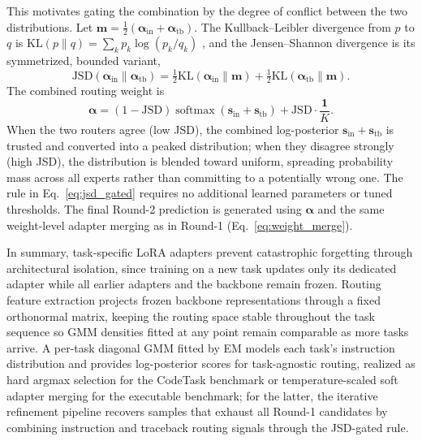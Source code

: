 This motivates gating the combination by the degree of conflict between the two distributions. Let $\mathbf{m}=\tfrac{1}{2}(\bm{\alpha}_{\mathrm{in}}+\bm{\alpha}_{\mathrm{tb}})$. The Kullback--Leibler divergence from $p$ to $q$ is $\mathrm{KL}(p\|q)=\sum_k p_k\log(p_k/q_k)$ \citep{kullback1951information}, and the Jensen--Shannon divergence \citep{lin1991divergence} is its symmetrized, bounded variant,
\begin{equation}
    \mathrm{JSD}(\bm{\alpha}_{\mathrm{in}} \| \bm{\alpha}_{\mathrm{tb}})
    = \tfrac{1}{2}\mathrm{KL}(\bm{\alpha}_{\mathrm{in}}\|\mathbf{m})
    + \tfrac{1}{2}\mathrm{KL}(\bm{\alpha}_{\mathrm{tb}}\|\mathbf{m}).
    \label{eq:jsd}
\end{equation}
The combined routing weight is
\begin{equation}
    \bm{\alpha} = (1 - \mathrm{JSD})\operatorname{softmax}(\mathbf{s}_{\mathrm{in}} + \mathbf{s}_{\mathrm{tb}}) + \mathrm{JSD} \cdot \frac{\mathbf{1}}{K}.
    \label{eq:jsd_gated}
\end{equation}
When the two routers agree (low JSD), the combined log-posterior $\mathbf{s}_{\mathrm{in}}+\mathbf{s}_{\mathrm{tb}}$ is trusted and converted into a peaked distribution; when they disagree strongly (high JSD), the distribution is blended toward uniform, spreading probability mass across all experts rather than committing to a potentially wrong one. The rule in Eq.~\eqref{eq:jsd_gated} requires no additional learned parameters or tuned thresholds. The final Round-2 prediction is generated using $\bm{\alpha}$ and the same weight-level adapter merging as in Round-1 (Eq.~\eqref{eq:weight_merge}).

In summary, task-specific LoRA adapters prevent catastrophic forgetting through architectural isolation, since training on a new task updates only its dedicated adapter while all earlier adapters and the backbone remain frozen. Routing feature extraction projects frozen backbone representations through a fixed orthonormal matrix, keeping the routing space stable throughout the task sequence so GMM densities fitted at any point remain comparable as more tasks arrive. A per-task diagonal GMM fitted by EM models each task's instruction distribution and provides log-posterior scores for task-agnostic routing, realized as hard argmax selection for the CodeTask benchmark or temperature-scaled soft adapter merging for the executable benchmark; for the latter, the iterative refinement pipeline recovers samples that exhaust all Round-1 candidates by combining instruction and traceback routing signals through the JSD-gated rule.
